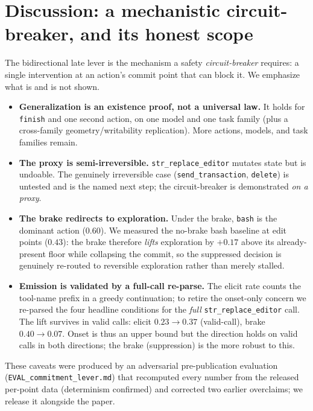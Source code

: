 \documentclass[11pt]{article}
\begin{document}
\section{Discussion: a mechanistic circuit-breaker, and its honest scope}\label{sec:disc}
The bidirectional late lever is the mechanism a safety \emph{circuit-breaker} requires: a single intervention
at an action's commit point that can block it. We emphasize what is and is not shown.
\begin{itemize}\itemsep1pt
  \item \textbf{Generalization is an existence proof, not a universal law.} It holds for \texttt{finish} and
    one second action, on one model and one task family (plus a cross-family geometry/writability replication).
    More actions, models, and task families remain.
  \item \textbf{The proxy is semi-irreversible.} \texttt{str\_replace\_editor} mutates state but is undoable.
    The genuinely irreversible case (\texttt{send\_transaction}, \texttt{delete}) is untested and is the named
    next step; the circuit-breaker is demonstrated \emph{on a proxy}.
  \item \textbf{The brake redirects to exploration.} Under the brake, \texttt{bash} is the dominant action
    (0.60). We measured the no-brake bash baseline at edit points ($0.43$): the brake therefore \emph{lifts}
    exploration by $+0.17$ above its already-present floor while collapsing the commit, so the suppressed
    decision is genuinely re-routed to reversible exploration rather than merely stalled.
  \item \textbf{Emission is validated by a full-call re-parse.} The elicit rate counts the tool-name prefix in a
    greedy continuation; to retire the onset-only concern we re-parsed the four headline conditions for the
    \emph{full} \texttt{str\_replace\_editor} call. The lift survives in valid calls: elicit $0.23 \to 0.37$
    (valid-call), brake $0.40 \to 0.07$. Onset is thus an upper bound but the direction holds on valid calls in
    both directions; the brake (suppression) is the more robust to this.
\end{itemize}
These caveats were produced by an adversarial pre-publication evaluation (\texttt{EVAL\_commitment\_lever.md})
that recomputed every number from the released per-point data (determinism confirmed) and corrected two
earlier overclaims; we release it alongside the paper.
\end{document}
